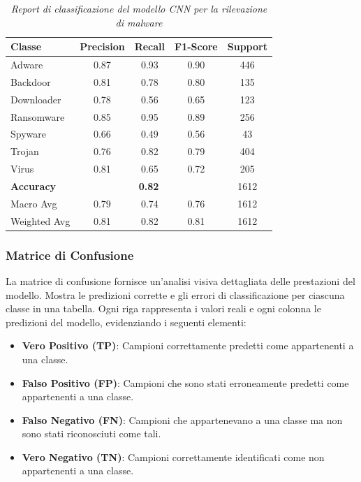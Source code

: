 \newpage

\begin{table}[ht]
\centering
\begin{tabular}{@{}|lcccc|@{}}
\toprule
\textbf{Classe}      & \textbf{Precision} & \textbf{Recall} & \textbf{F1-Score} & \textbf{Support} \\ \midrule
Adware          & 0.87               & 0.93            & 0.90              & 446              \\
Backdoor        & 0.81               & 0.78            & 0.80              & 135              \\
Downloader      & 0.78               & 0.56            & 0.65              & 123              \\
Ransomware      & 0.85               & 0.95            & 0.89              & 256              \\
Spyware         & 0.66               & 0.49            & 0.56              & 43               \\
Trojan          & 0.76               & 0.82            & 0.79              & 404              \\
Virus           & 0.81               & 0.65            & 0.72              & 205              \\ \midrule
\textbf{Accuracy}      & \multicolumn{3}{c}{\textbf{0.82}}         & 1612             \\ \midrule
Macro Avg       & 0.79               & 0.74            & 0.76              & 1612             \\
Weighted Avg    & 0.81               & 0.82            & 0.81              & 1612             \\ \bottomrule
\end{tabular}
\vspace{.2cm}
\caption{\emph{Report di classificazione del modello CNN per la rilevazione di malware}}
\label{tab:classification_report}
\end{table}


\subsubsection{Matrice di Confusione}
La matrice di confusione fornisce un'analisi visiva dettagliata delle prestazioni del modello. Mostra le predizioni corrette e gli errori di classificazione per ciascuna classe in una tabella. Ogni riga rappresenta i valori reali e ogni colonna le predizioni del modello, evidenziando i seguenti elementi:
\begin{itemize}
    \item \textbf{Vero Positivo (TP)}: Campioni correttamente predetti come appartenenti a una classe.
    \item \textbf{Falso Positivo (FP)}: Campioni che sono stati erroneamente predetti come appartenenti a una classe.
    \item \textbf{Falso Negativo (FN)}: Campioni che appartenevano a una classe ma non sono stati riconosciuti come tali.
    \item \textbf{Vero Negativo (TN)}: Campioni correttamente identificati come non appartenenti a una classe.
\end{itemize}

